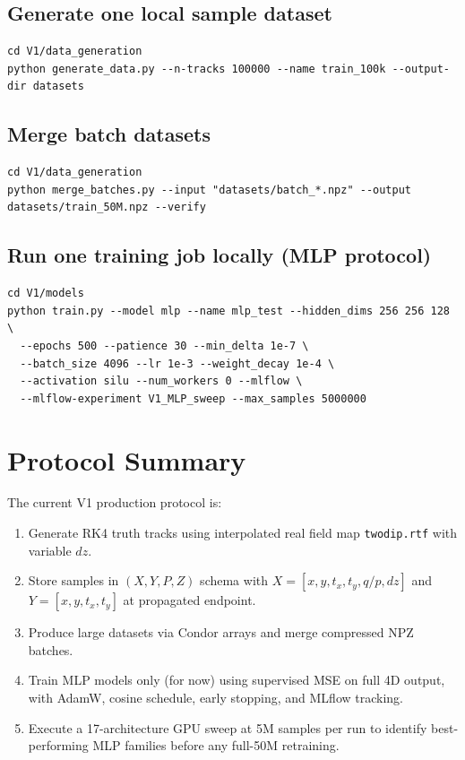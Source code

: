 \documentclass[11pt,a4paper]{article}
\begin{document}
\subsection{Generate one local sample dataset}
\begin{lstlisting}[style=bashstyle]
cd V1/data_generation
python generate_data.py --n-tracks 100000 --name train_100k --output-dir datasets
\end{lstlisting}

\subsection{Merge batch datasets}
\begin{lstlisting}[style=bashstyle]
cd V1/data_generation
python merge_batches.py --input "datasets/batch_*.npz" --output datasets/train_50M.npz --verify
\end{lstlisting}

\subsection{Run one training job locally (MLP protocol)}
\begin{lstlisting}[style=bashstyle]
cd V1/models
python train.py --model mlp --name mlp_test --hidden_dims 256 256 128 \
  --epochs 500 --patience 30 --min_delta 1e-7 \
  --batch_size 4096 --lr 1e-3 --weight_decay 1e-4 \
  --activation silu --num_workers 0 --mlflow \
  --mlflow-experiment V1_MLP_sweep --max_samples 5000000
\end{lstlisting}

\section{Protocol Summary}
The current V1 production protocol is:
\begin{enumerate}[leftmargin=*]
  \item Generate RK4 truth tracks using interpolated real field map \texttt{twodip.rtf} with variable $dz$.
  \item Store samples in $(X,Y,P,Z)$ schema with $X=[x,y,t_x,t_y,q/p,dz]$ and $Y=[x,y,t_x,t_y]$ at propagated endpoint.
  \item Produce large datasets via Condor arrays and merge compressed NPZ batches.
  \item Train MLP models only (for now) using supervised MSE on full 4D output, with AdamW, cosine schedule, early stopping, and MLflow tracking.
  \item Execute a 17-architecture GPU sweep at 5M samples per run to identify best-performing MLP families before any full-50M retraining.
\end{enumerate}
\end{document}
